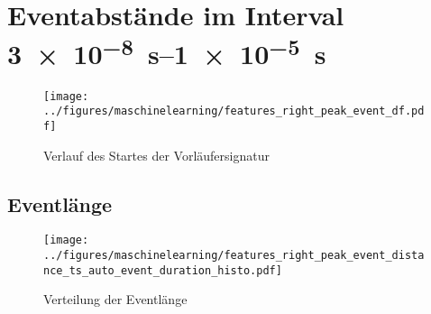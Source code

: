 \begin{table}[h!]
\centering
\caption{Model Performance für die Vorhersage der Eventlänge}
\end{table}








\section{Eventabstände im Interval \SIrange{3e-8}{1e-5}{\second}}

\begin{figure}[H]
    \centering
      \texttt{[image: ../figures/maschinelearning/features\_right\_peak\_event\_df.pdf]}
      \caption{Verlauf des Startes der Vorläufersignatur}
      \label{fig:event-right-current_sliece}
\end{figure}

\subsection{Eventlänge}

\begin{figure}[H]
    \centering
      \texttt{[image: ../figures/maschinelearning/features\_right\_peak\_event\_distance\_ts\_auto\_event\_duration\_histo.pdf]}
      \caption{Verteilung der Eventlänge}
      \label{fig:event_right_event_duration_box}
\end{figure}



